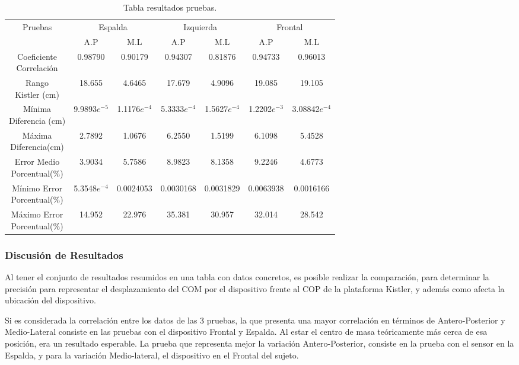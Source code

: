 \documentclass[12pt,a4paper]{article}
\begin{document}
\begin{table}[H]
	\centering
	\caption{Tabla resultados pruebas.}
	\begin{tabular}{|c|c|c|c|c|c|c|}
		\hline
		\multirow{2}{*}{Pruebas} &
		\multicolumn{2}{c|}{Espalda} &
		\multicolumn{2}{c|}{Izquierda} &
		\multicolumn{2}{c|}{Frontal} \\
		\cline{2-7}
		& A.P & M.L & A.P  & M.L & A.P & M.L \\
		\hline
		\shortstack{Coeficiente\\Correlación} & 0.98790 &0.90179 & 0.94307 & 0.81876 & 0.94733 & 0.96013 \\
		\hline
		\shortstack{Rango\\Kistler (cm)} & 18.655 & 4.6465 & 17.679 & 4.9096 & 19.085 & 19.105 \\
		\hline
		\shortstack{Mínima \\Diferencia (cm)} & 9.9893$e^{-5}$ & 1.1176$e^{-4}$ & 5.3333$e^{-4}$ &1.5627$e^{-4}$ & 1.2202$e^{-3}$ & 3.08842$e^{-4}$ \\
		\hline
		\shortstack{Máxima \\Diferencia(cm)} & 2.7892 & 1.0676 & 6.2550 & 1.5199 & 6.1098 & 5.4528 \\
		\hline
		\shortstack{Error Medio\\Porcentual(\%) } & 3.9034 & 5.7586 & 8.9823 & 8.1358 & 9.2246 & 4.6773 \\
		\hline
		\shortstack{Mínimo Error\\Porcentual(\%)} & 5.3548$e^{-4}$ & 0.0024053 & 0.0030168 & 0.0031829 & 0.0063938 & 0.0016166 \\
		\hline
		\shortstack{Máximo Error\\Porcentual(\%)} & 14.952 & 22.976 & 35.381& 30.957 & 32.014 & 28.542 \\
		\hline
	\end{tabular}
	\label{table:resultadosPruebas}
\end{table}	

\subsubsection{Discusión de Resultados}
Al tener el conjunto de resultados resumidos en una tabla con datos concretos, es posible realizar la comparación, para determinar la precisión para representar el desplazamiento del COM por el dispositivo frente al COP de la plataforma Kistler, y además como afecta la ubicación del dispositivo.

Si es considerada la correlación entre los datos de las 3 pruebas, la que presenta una mayor correlación en términos de Antero-Posterior y Medio-Lateral consiste en las pruebas con el dispositivo Frontal y Espalda. Al estar el centro de masa teóricamente más cerca de esa posición, era un resultado esperable. La prueba que representa mejor la variación Antero-Posterior, consiste en la prueba con el sensor en la Espalda, y para la variación Medio-lateral, el dispositivo en el Frontal del sujeto.
\end{document}
